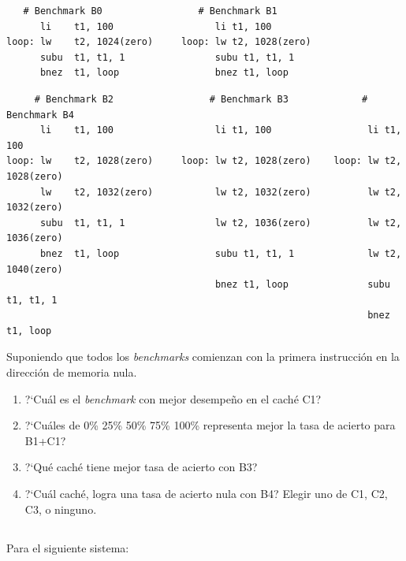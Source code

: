 \begin{center}
	\begin{small}
	\begin{verbatim}
   # Benchmark B0                 # Benchmark B1
      li    t1, 100                  li t1, 100
loop: lw    t2, 1024(zero)     loop: lw t2, 1028(zero)
      subu  t1, t1, 1                subu t1, t1, 1
      bnez  t1, loop                 bnez t1, loop
   \end{verbatim}
  \end{small}

  \begin{small}
  \begin{verbatim}
	 # Benchmark B2                 # Benchmark B3             # Benchmark B4
      li    t1, 100                  li t1, 100                 li t1, 100
loop: lw    t2, 1028(zero)     loop: lw t2, 1028(zero)    loop: lw t2, 1028(zero)
      lw    t2, 1032(zero)           lw t2, 1032(zero)          lw t2, 1032(zero)
      subu  t1, t1, 1                lw t2, 1036(zero)          lw t2, 1036(zero)
      bnez  t1, loop                 subu t1, t1, 1             lw t2, 1040(zero)
                                     bnez t1, loop              subu t1, t1, 1
                                                                bnez t1, loop
	\end{verbatim}
	\end{small}
\end{center}

Suponiendo que todos los \emph{benchmarks} comienzan con la primera	instrucción en la dirección de memoria nula.

\begin{enumerate}
 \item	?`Cuál es el \emph{benchmark} con mejor desempeño en el caché C1?
 \item	?`Cuáles de 0\% 25\% 50\% 75\% 100\% representa mejor la tasa de acierto para B1+C1?
 \item	?`Qué caché tiene mejor tasa de acierto con B3?
 \item	?`Cuál caché, logra una tasa de acierto nula con B4? Elegir uno de C1, C2, C3, o ninguno.
\end{enumerate}


\subsection{}
Para el siguiente sistema:

